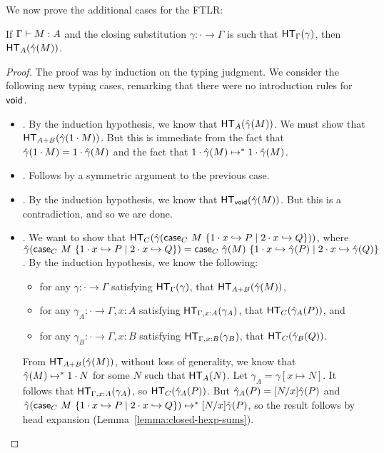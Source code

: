 \documentclass{article}
\begin{document}
We now prove the additional cases for the FTLR:

\begin{theorem}
  \label{thm:closed-ftlr-sums}
  If $\Gamma \vdash M : A$ and the closing substitution $\gamma : \cdot \to \Gamma$ is such that $\mathsf{HT}_{\Gamma}(\gamma)$, then $\mathsf{HT}_{A}(\hat \gamma(M))$.
\end{theorem}

\begin{proof}
  The proof was by induction on the typing judgment.
  We consider the following new typing cases, remarking that there were no introduction rules for $\mathsf{void}$.
  \begin{itemize}
  \item {}. By the induction hypothesis, we know that $\mathsf{HT}_{A}(\hat \gamma(M))$.
    We must show that $\mathsf{HT}_{A + B}(\hat \gamma(1\cdot M))$.
    But this is immediate from the fact that $\hat \gamma(1\cdot M) = 1\cdot\hat \gamma(M)$ and the fact that $1\cdot\hat \gamma(M) \mapsto^* 1\cdot\hat \gamma(M)$.
  \item {}. Follows by a symmetric argument to the previous case.
  \item {}. By the induction hypothesis, we know that $\mathsf{HT}_{\mathsf{void}}(\hat \gamma(M))$.
    But this is a contradiction, and so we are done.
  \item {}. We want to show that $\mathsf{HT}_{C}(\hat\gamma(\mathsf{case}_{C}\ M\ \{1\cdot x \hookrightarrow P \mid 2\cdot x \hookrightarrow Q\}))$, where $\hat\gamma(\mathsf{case}_{C}\ M\ \{1\cdot x \hookrightarrow P \mid 2\cdot x \hookrightarrow Q\}) = \mathsf{case}_{C}\ \hat\gamma(M)\ \{1\cdot x \hookrightarrow \hat\gamma(P) \mid 2\cdot x \hookrightarrow \hat\gamma(Q)\}$.
    By the induction hypothesis, we know the following:
    \begin{itemize}
    \item for any $\gamma : \cdot \to \Gamma$ satisfying $\mathsf{HT}_{\Gamma}(\gamma)$, that $\mathsf{HT}_{A+B}(\hat\gamma(M))$,
    \item for any $\gamma_A : \cdot \to \Gamma, x:A$ satisfying $\mathsf{HT}_{\Gamma, x:A}(\gamma_A)$, that $\mathsf{HT}_{C}(\hat\gamma_A(P))$, and
    \item for any $\gamma_B : \cdot \to \Gamma, x:B$ satisfying $\mathsf{HT}_{\Gamma, x:B}(\gamma_B)$, that $\mathsf{HT}_{C}(\hat\gamma_B(Q))$.
    \end{itemize}

    From $\mathsf{HT}_{A+B}(\hat\gamma(M))$, without loss of generality, we know that $\hat\gamma(M) \mapsto^* 1\cdot N$ for some $N$ such that $\mathsf{HT}_{A}(N)$.
    Let $\gamma_A = \gamma[x \mapsto N]$.
    It follows that $\mathsf{HT}_{\Gamma,x:A}(\gamma_A)$, so $\mathsf{HT}_{C}(\hat\gamma_A(P))$.
    But $\hat\gamma_A(P) = [N/x]\hat\gamma(P)$ and $\hat\gamma(\mathsf{case}_{C}\ M\ \{1\cdot x \hookrightarrow P \mid 2\cdot x \hookrightarrow Q\}) \mapsto^* [N/x]\hat\gamma(P)$, so the result follows by head expansion (Lemma~\ref{lemma:closed-hexp-sums}).\qedhere
  \end{itemize}
\end{proof}
\end{document}
